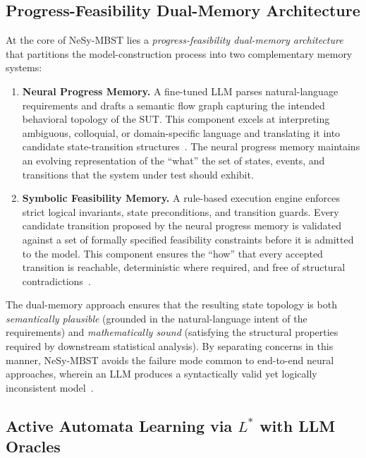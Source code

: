 \subsection{Progress-Feasibility Dual-Memory Architecture}%
\label{subsec:dual_memory}

At the core of NeSy-MBST lies a \emph{progress-feasibility dual-memory architecture} that partitions the model-construction process into two complementary memory systems:

\begin{enumerate}
    \item \textbf{Neural Progress Memory.} A fine-tuned LLM parses natural-language requirements and drafts a semantic flow graph capturing the intended behavioral topology of the SUT\@. This component excels at interpreting ambiguous, colloquial, or domain-specific language and translating it into candidate state-transition structures~\cite{chatfume}. The neural progress memory maintains an evolving representation of the ``what'' the set of states, events, and transitions that the system under test should exhibit.

    \item \textbf{Symbolic Feasibility Memory.} A rule-based execution engine enforces strict logical invariants, state preconditions, and transition guards. Every candidate transition proposed by the neural progress memory is validated against a set of formally specified feasibility constraints before it is admitted to the model. This component ensures the ``how'' that every accepted transition is reachable, deterministic where required, and free of structural contradictions~\cite{taxonomy_mbt}.
\end{enumerate}

The dual-memory approach ensures that the resulting state topology is both \emph{semantically plausible} (grounded in the natural-language intent of the requirements) and \emph{mathematically sound} (satisfying the structural properties required by downstream statistical analysis). By separating concerns in this manner, NeSy-MBST avoids the failure mode common to end-to-end neural approaches, wherein an LLM produces a syntactically valid yet logically inconsistent model~\cite{llm_numerical_reasoning}.

\subsection{Active Automata Learning via $L^{*}$ with LLM Oracles}%
\label{subsec:lstar}

